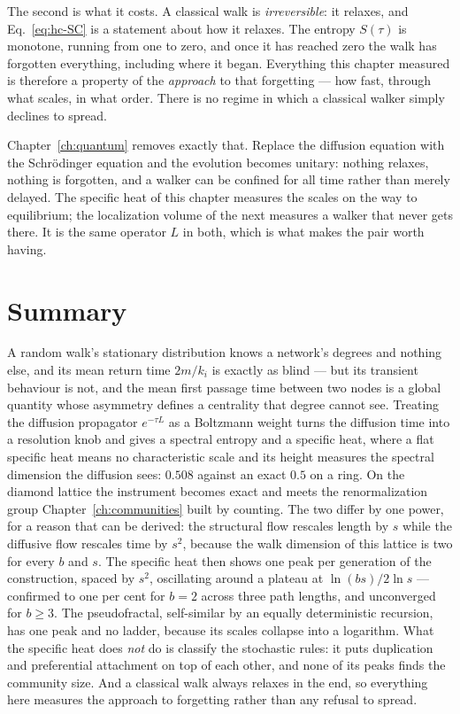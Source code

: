 The second is what it costs. A classical walk is \emph{irreversible}: it relaxes,
and Eq.~\eqref{eq:hc-SC} is a statement about how it relaxes. The entropy $S(\tau)$
is monotone, running from one to zero, and once it has reached zero the walk has
forgotten everything, including where it began. Everything this chapter measured is
therefore a property of the \emph{approach} to that forgetting --- how fast, through
what scales, in what order. There is no regime in which a classical walker simply
declines to spread.

Chapter~\ref{ch:quantum} removes exactly that. Replace the diffusion equation with
the Schr\"odinger equation and the evolution becomes unitary: nothing relaxes,
nothing is forgotten, and a walker can be confined for all time rather than merely
delayed. The specific heat of this chapter measures the scales on the way to
equilibrium; the localization volume of the next measures a walker that never gets
there. It is the same operator $L$ in both, which is what makes the pair worth
having.

\section{Summary}

A random walk's stationary distribution knows a network's degrees and nothing else,
and its mean return time $2m/k_i$ is exactly as blind --- but its transient behaviour
is not, and the mean first passage time between two nodes is a global quantity whose
asymmetry defines a centrality that degree cannot see. Treating the diffusion
propagator $e^{-\tau L}$ as a Boltzmann weight turns the diffusion time into a
resolution knob and gives a spectral entropy and a specific heat, where a flat
specific heat means no characteristic scale and its height measures the spectral
dimension the diffusion sees: $0.508$ against an exact $0.5$ on a ring. On the
diamond lattice the instrument becomes exact and meets the renormalization group
Chapter~\ref{ch:communities} built by counting. The two differ by one power, for a
reason that can be derived: the structural flow rescales length by $s$ while the
diffusive flow rescales time by $s^2$, because the walk dimension of this lattice is
two for every $b$ and $s$. The specific heat then shows one peak per generation of
the construction, spaced by $s^2$, oscillating around a plateau at
$\ln(bs)/2\ln s$ --- confirmed to one per cent for $b=2$ across three path lengths,
and unconverged for $b\ge3$. The pseudofractal, self-similar by an equally
deterministic recursion, has one peak and no ladder, because its scales collapse
into a logarithm. What the specific heat does \emph{not} do is classify the
stochastic rules: it puts duplication and preferential attachment on top of each
other, and none of its peaks finds the community size. And a classical walk always
relaxes in the end, so everything here measures the approach to forgetting rather than
any refusal to spread.
